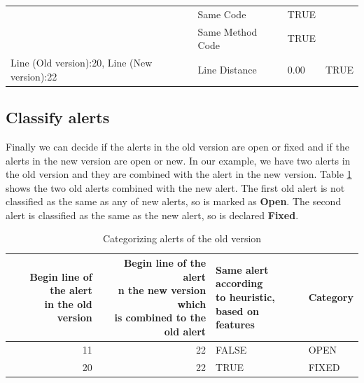\documentclass[
]{article}
\begin{document}
\begin{itemize}
\begin{table}[H]
\begin{tabular}[t]{l|l|l|l}
 & Same Code & TRUE & \\

\rowcolor{gray!6}   & Same Method Code & TRUE & \\

\multirow[t]{-8}{*}{\raggedright\arraybackslash Line (Old version):20, Line (New version):22} & Line Distance & 0.00 & \multirow[t]{-8}{*}{\raggedright\arraybackslash TRUE}\\
\hline
\end{tabular}
\end{table}

%
%
\end{itemize}


\normalsize

\subsection{Classify alerts}\label{heuristic}

Finally we can decide if the alerts in the old version are open or fixed
and if the alerts in the new version are open or new. In our example, we 
have two alerts in the old version and they are combined with the alert 
in the new version. Table \ref{tab_categorizing_old} shows the two old 
alerts combined with the new alert. The first old alert is not classified
as the same as any of new alerts, so is marked as \textbf{Open}. The second 
alert is classified as the same as the new alert, so is declared \textbf{Fixed}.

\small

\begin{table}[H]

\caption{\label{tab:unnamed-chunk-15}Categorizing alerts of the old version \label{tab_categorizing_old} }
\centering
\begin{tabular}[t]{r|r|l|l}
\hline
\makecell[l]{Begin line of the alert\\in the old version} & \makecell[l]{Begin line of the alert\\n the new version which\\is combined to the old alert} & \makecell[l]{Same alert according\\to heuristic,\\ based on features} & Category\\
\hline
\rowcolor{gray!6}  11 & 22 & FALSE & OPEN\\
\cline{1-4}
20 & 22 & TRUE & FIXED\\
\hline
\end{tabular}
\end{table}
\end{document}
